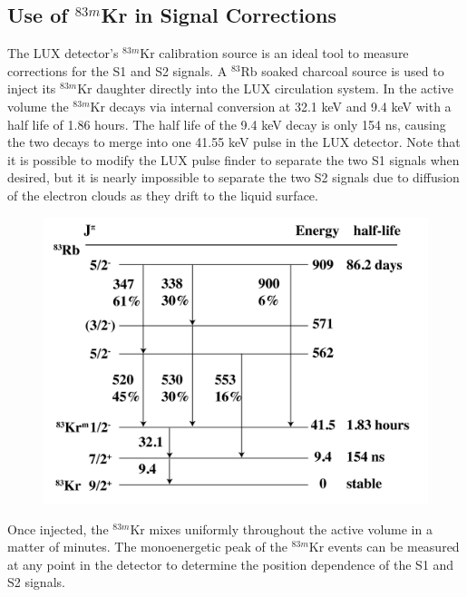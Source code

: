 \documentclass[a4paper,12pt]{article}
\begin{document}
{\subsection{Use of $^{83m}$Kr in Signal Corrections}

The LUX detector's $^{83m}$Kr calibration source is an ideal tool to measure corrections for the S1 and S2 signals. A $^{83}$Rb soaked charcoal source is used to inject its $^{83m}$Kr daughter directly into the LUX circulation system.  In the active volume the $^{83m}$Kr decays via internal conversion at 32.1 keV and 9.4 keV with a half life of 1.86 hours.  The half life of the 9.4 keV decay is only 154 ns, causing the two decays to merge into one 41.55 keV pulse in the LUX detector.  Note that it is possible to modify the LUX pulse finder to separate the two S1 signals when desired, but it is nearly impossible to separate the two S2 signals due to diffusion of the electron clouds as they drift to the liquid surface. 

\begin{figure} [!h]
\includegraphics[scale=.35]{Kr83Decay.png} 
\label{KrDecayScheme}
\end{figure}

Once injected, the $^{83m}$Kr mixes uniformly throughout the active volume in a matter of minutes. The monoenergetic peak of the $^{83m}$Kr events can be measured at any point in the detector to determine the position dependence of the S1 and S2 signals.

}
\end{document}
